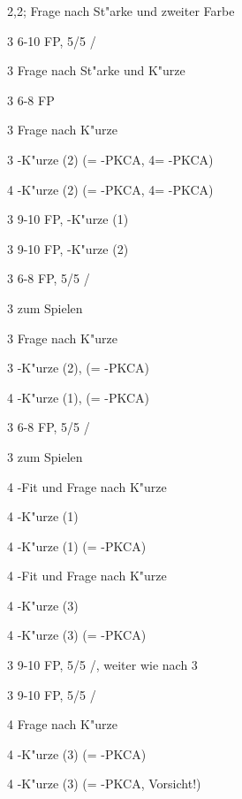 \begin{appendix}
\bdsc
\item[2\coe{}\sep2\SA;] Frage nach St"arke und zweiter Farbe
  \bdsc
  \item[3\tre] 6-10 FP, 5/5 \co/\tr
    \bdsc
    \item[3\kar] Frage nach St"arke und K"urze
      \bdsc
      \item[3\coe] 6-8 FP
        \bdsc
        \item[3\pik] Frage nach K"urze
          \bdsc
          \item[3\SA] \pi-K"urze (2) (\tre = \tr-PKCA, 4\pik = \co-PKCA)
          \item[4\tre] \ka-K"urze (2) (\kar = \tr-PKCA, 4\pik = \co-PKCA)
          \edsc
        \edsc
      \item[3\pik] 9-10 FP, \pi-K"urze (1)
      \item[3\SA] 9-10 FP, \ka-K"urze (2)
      \edsc
    \edsc
  \item[3\kar] 6-8 FP, 5/5 \co/\ka
    \bdsc
    \item[3\coe] zum Spielen
    \item[3\pik] Frage nach K"urze
      \bdsc
      \item[3\SA] \pi-K"urze (2), (\kar = \ka-PKCA)
      \item[4\tr] \tr-K"urze (1), (\pik = \co-PKCA)
      \edsc
    \edsc
  \item[3\coe] 6-8 FP, 5/5 \co/\pi
    \bdsc
    \item[3\pik] zum Spielen
    \item[4\tre] \co-Fit und Frage nach K"urze
      \bdsc
      \item[4\kar] \ka-K"urze (1)
      \item[4\coe] \tr-K"urze (1) (\pik = \co-PKCA)
      \edsc
    \item[4\kar] \pi-Fit und Frage nach K"urze
      \bdsc
      \item[4\coe] \tr-K"urze (3)
      \item[4\pik] \ka-K"urze (3) (\SA = \pi-PKCA)
      \edsc
    \edsc
  \item[3\pik] 9-10 FP, 5/5 \co/\pi, weiter wie nach 3\coe
  \item[3\SA] 9-10 FP, 5/5 \co/\ka
    \bdsc
    \item[4\tre] Frage nach K"urze
      \bdsc
      \item[4\kar] \tr-K"urze (3) (\pik = \co-PKCA)
      \item[4\coe] \pi-K"urze (3) (\SA = \ka-PKCA, Vorsicht!)
      \edsc
    \edsc
  \edsc
\edsc


\end{appendix}



